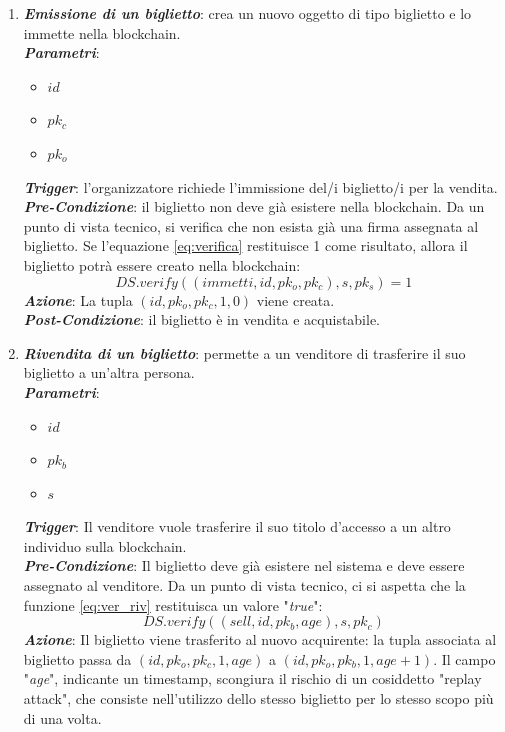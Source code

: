 \begin{enumerate}
\item \textbf{\textit{Emissione di un biglietto}}: crea un nuovo oggetto di tipo biglietto e lo immette nella blockchain. \\
\textit{\textbf{Parametri}}:
\begin{itemize}
\item $ id $
\item $ pk_{c} $ 
\item $ pk_{o} $
\end{itemize}
\textbf{\textit{Trigger}}: l'organizzatore richiede l'immissione del/i biglietto/i per la vendita. \\
\textbf{\textit{Pre-Condizione}}: il biglietto non deve già esistere nella blockchain. Da un punto di vista tecnico, si verifica che non esista già una firma assegnata al biglietto. Se l'equazione \ref{eq:verifica} restituisce 1 come risultato, allora il biglietto potrà essere creato nella blockchain: 
\begin{equation} \label{eq:verifica}
DS.verify((immetti, id,pk_{o}, pk_{c}), s, pk_{s}) = 1
\end{equation}
\textbf{\textit{Azione}}: La tupla $(id, pk_{o}, pk_{c}, 1, 0)$ viene creata. \\
\textbf{\textit{Post-Condizione}}: il biglietto è in vendita e acquistabile.
\item \textbf{\textit{Rivendita di un biglietto}}: permette a un venditore di trasferire il suo biglietto a un'altra persona. \\
\textbf{\textit{Parametri}}:
\begin{itemize}
\item $id$
\item $pk_{b}$
\item $s$
\end{itemize}
\textbf{\textit{Trigger}}: Il venditore vuole trasferire il suo titolo d'accesso a un altro individuo sulla blockchain. \\
\textbf{\textit{Pre-Condizione}}: Il biglietto deve già esistere nel sistema e deve essere assegnato al venditore. Da un punto di vista tecnico, ci si aspetta che la funzione \ref{eq:ver_riv} restituisca un valore "\textit{true}":
\begin{equation} \label{eq:ver_riv}
DS.verify((sell, id, pk_{b}, age), s, pk_{c})
\end{equation}
\textbf{\textit{Azione}}: Il biglietto viene trasferito al nuovo acquirente: la tupla associata al biglietto passa da $(id, pk_{o}, pk_{c}, 1, age)$ a $(id, pk_{o}, pk_{b}, 1, age + 1)$. Il campo "\textit{age}", indicante un timestamp, scongiura il rischio di un cosiddetto "replay attack", che consiste nell'utilizzo dello stesso biglietto per lo stesso scopo più di una volta. \\

\end{enumerate}

